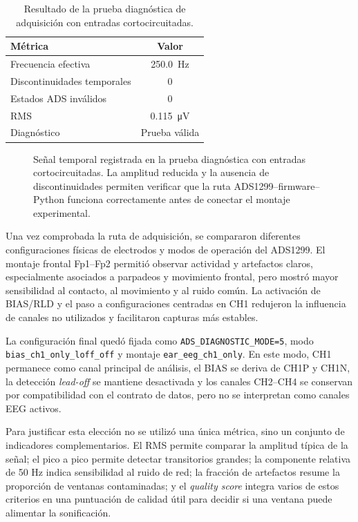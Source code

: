 \documentclass[../main.tex]{subfiles}
\begin{document}
\begin{table}[htbp]
    \centering
    \caption{Resultado de la prueba diagnóstica de adquisición con entradas cortocircuitadas.}
    \label{tab:validacion_shorted_inputs}
    \begin{tabular}{l c}
        \hline
        \textbf{Métrica} & \textbf{Valor} \\
        \hline
        Frecuencia efectiva & \SI{250.0}{\hertz} \\
        Discontinuidades temporales & 0 \\
        Estados ADS inválidos & 0 \\
        RMS & \SI{0.115}{\micro\volt} \\
        Diagnóstico & Prueba válida  \\
        \hline
    \end{tabular}
\end{table}

\begin{figure}[htbp]
    \centering
    \caption{Señal temporal registrada en la prueba diagnóstica con entradas cortocircuitadas. La amplitud reducida y la ausencia de discontinuidades permiten verificar que la ruta ADS1299--firmware--Python funciona correctamente antes de conectar el montaje experimental.}
    \label{fig:validacion_shorted_inputs}
\end{figure}

Una vez comprobada la ruta de adquisición, se compararon diferentes configuraciones físicas de electrodos y modos de operación del ADS1299. El montaje frontal Fp1--Fp2 permitió observar actividad y artefactos claros, especialmente asociados a parpadeos y movimiento frontal, pero mostró mayor sensibilidad al contacto, al movimiento y al ruido común. La activación de BIAS/RLD y el paso a configuraciones centradas en CH1 redujeron la influencia de canales no utilizados y facilitaron capturas más estables.

La configuración final quedó fijada como \texttt{ADS\_DIAGNOSTIC\_MODE=5}, modo \texttt{bias\_ch1\_only\_loff\_off} y montaje \texttt{ear\_eeg\_ch1\_only}. En este modo, CH1 permanece como canal principal de análisis, el BIAS se deriva de CH1P y CH1N, la detección \textit{lead-off} se mantiene desactivada y los canales CH2--CH4 se conservan por compatibilidad con el contrato de datos, pero no se interpretan como canales EEG activos.

Para justificar esta elección no se utilizó una única métrica, sino un conjunto de indicadores complementarios. El RMS permite comparar la amplitud típica de la señal; el pico a pico permite detectar transitorios grandes; la componente relativa de 50 Hz indica sensibilidad al ruido de red; la fracción de artefactos resume la proporción de ventanas contaminadas; y el \textit{quality score} integra varios de estos criterios en una puntuación de calidad útil para decidir si una ventana puede alimentar la sonificación.
\end{document}
